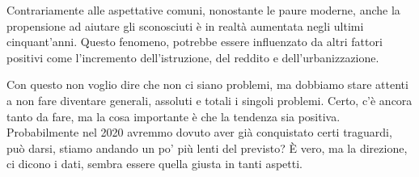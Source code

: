 \documentclass[12pt]{book} %
\begin{document}
Contrariamente alle aspettative comuni, nonostante le paure moderne, anche la propensione ad aiutare gli sconosciuti è in realtà aumentata negli ultimi cinquant’anni. Questo fenomeno, potrebbe essere influenzato da altri fattori positivi come l’incremento dell’istruzione, del reddito e  dell’urbanizzazione.


\bigskip

Con questo non voglio dire che non ci siano problemi, ma dobbiamo stare attenti a non fare diventare generali, assoluti
e totali i singoli problemi. Certo, c'è ancora tanto da fare, ma la cosa importante è che la
tendenza sia positiva. Probabilmente nel 2020 avremmo dovuto aver già conquistato certi traguardi, può darsi, stiamo
andando un po' più lenti del previsto? È vero, ma la direzione, ci dicono i dati, sembra essere quella giusta in tanti
aspetti.
\end{document}
